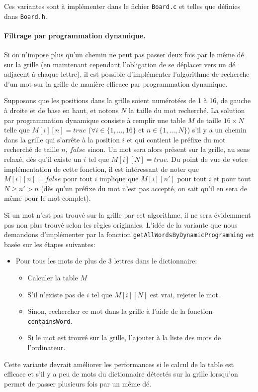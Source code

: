 \documentclass[a4paper,10pt]{article}
\begin{document}
Ces variantes sont à implémenter dans le fichier \texttt{Board.c} et telles que
définies dans \texttt{Board.h}.


\paragraph{Filtrage par programmation dynamique.}

Si on n'impose plus qu'un chemin ne peut pas passer deux fois par le
même dé sur la grille (en maintenant cependant l'obligation de se
déplacer vers un dé adjacent à chaque lettre), il est possible
d'implémenter l'algorithme de recherche d'un mot sur la grille de
manière efficace par programmation dynamique.

Supposons que les positions dans la grille soient numérotées de 1 à
16, de gauche à droite et de base en haut, et notons $N$ la taille du
mot recherché. La solution par programmation dynamique consiste à
remplir une table $M$ de taille $16\times N$ telle que $M[i][n]=true$
($\forall i\in\{1,\ldots,16\}$ et $n\in\{1,\ldots,N\}$) s'il y a un
chemin dans la grille qui s'arrête à la position $i$ et qui contient
le préfixe du mot recherché de taille $n$, $false$ sinon. Un mot sera
alors présent sur la grille, au sens relaxé, dès qu'il existe un $i$
tel que $M[i][N]=true$. Du point de vue de votre implémentation de
cette fonction, il est intéressant de noter que $M[i][n]=false$
pour tout $i$ implique que $M[i][n']$ pour tout $i$ et pour tout
$N\geq n'>n$ (dès qu'un préfixe du mot n'est pas accepté, on sait qu'il en
sera de même pour le mot complet).

Si un mot n'est pas trouvé sur la grille par cet algorithme, il ne
sera évidemment pas non plus trouvé selon les règles
originales. L'idée de la variante que nous demandons d'implémenter
 par la fonction \texttt{getAllWordsByDynamicProgramming} est basée sur les étapes suivantes:
\begin{itemize}
\item Pour tous les mots de plus de 3 lettres dans le dictionnaire:
\begin{itemize}
\item Calculer la table $M$
\item S'il n'existe pas de $i$ tel que $M[i][N]$ est vrai, rejeter le mot.
\item Sinon, rechercher ce mot dans la grille à l'aide de la fonction
  \texttt{containsWord}.
\item Si le mot est trouvé sur la grille, l'ajouter à la liste des mots de l'ordinateur.
\end{itemize}
\end{itemize}
Cette variante devrait améliorer les performances si le calcul de la
table est efficace et s'il y a peu de mots du dictionnaire détectés
sur la grille lorsqu'on permet de passer plusieurs fois par un même
dé.
\end{document}
